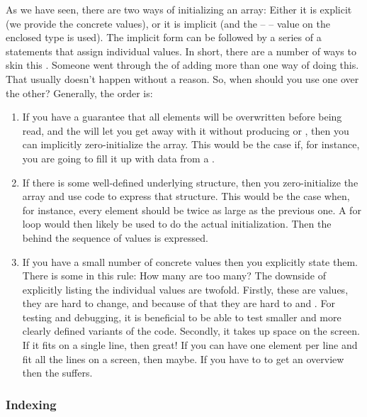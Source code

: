As we have seen, there are two ways of initializing an array: Either it is explicit (we provide the concrete values), or it is implicit (and the  --  -- value on the enclosed type is used). The implicit form can be followed by a series of a statements that assign individual values. In short, there are a number of ways to skin this . Someone went through the  of adding more than one way of doing this. That usually doesn't happen without a reason. So, when should you use one over the other? Generally, the order is:
\begin{enumerate}
  \item If you have a guarantee that all elements will be overwritten before being read, and the  will let you get away with it without producing  or , then you can implicitly zero-initialize the array. This would be the case if, for instance, you are going to fill it up with data from a .
  \item If there is some well-defined underlying structure, then you zero-initialize the array and use code to express that structure. This would be the case when, for instance, every element should be twice as large as the previous one. A for loop would then likely be used to do the actual initialization. Then the  behind the sequence of values is expressed.
  \item If you have a small number of concrete values then you explicitly state them. There is some  in this rule: How many are too many? The downside of explicitly listing the individual values are twofold. Firstly, these are  values, they are hard to change, and because of that they are hard to  and . For testing and debugging, it is beneficial to be able to test smaller and more clearly defined variants of the code. Secondly, it takes up space on the screen. If it fits on a single line, then great! If you can have one element per line and fit all the lines on a screen, then maybe. If you have to  to get an overview then the  suffers.
\end{enumerate}

\subsubsection{Indexing}

